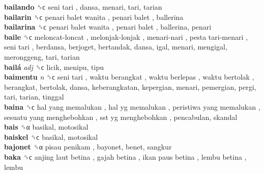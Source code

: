 \textbf{bailando} ␝ϲ   seni tari , dansa, menari, tari, tarian  \\
\textbf{bailarin} ␝ϲ   penari balet wanita ,  penari balet , ballerina  \\
\textbf{bailarina} ␝ϲ   penari balet wanita ,  penari balet , ballerina, penari  \\
\textbf{baile} ␝ϲ   meloncat-loncat ,  melonjak-lonjak ,  menari-nari ,  pesta tari-menari ,  seni tari , berdansa, berjoget, bertandak, dansa, igal, menari, mengigal, meronggeng, tari, tarian  \\
\textbf{bailá} \emph{adj}  ␝ϲ  licik, menipu, tipu  \\
\textbf{baimentu} \emph{n}  ␝ϲ   seni tari ,  waktu berangkat ,  waktu berlepas ,  waktu bertolak , berangkat, bertolak, dansa, keberangkatan, kepergian, menari, pemergian, pergi, tari, tarian, tinggal  \\
\textbf{baina} ␝ϲ   hal yang memalukan ,  hal yg memalukan ,  peristiwa yang memalukan ,  sesuatu yang menghebohkan ,  sst yg menghebohkan , pencabulan, skandal  \\
\textbf{bais} ␝α  basikal, motosikal  \\
\textbf{baiskel} ␝ϲ  basikal, motosikal  \\
\textbf{bajonet} ␝α   pisau penikam , bayonet, benet, sangkur  \\
\textbf{baka} ␝ϲ   anjing laut betina ,  gajah betina ,  ikan paus betina ,  lembu betina , lembu  \\
